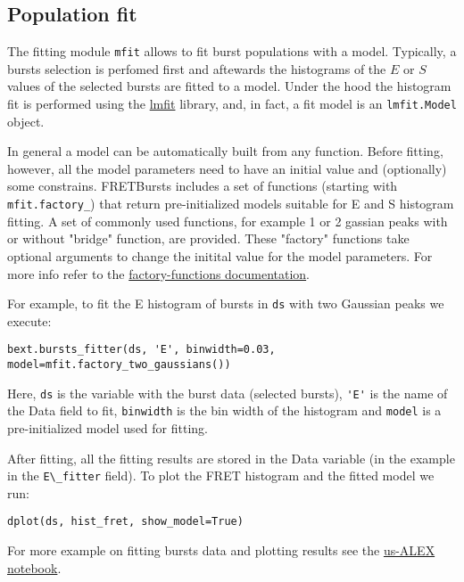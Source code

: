 
\subsection{Population fit}

The fitting module \verb|mfit| allows to fit burst populations with a model. Typically, a bursts selection is perfomed first and aftewards the histograms of the $E$ or $S$ values of the selected bursts are fitted to a model. Under the hood the histogram fit is performed using the \href{http://lmfit.github.io/lmfit-py/}{lmfit} library, and, in fact, 
a fit model is an \verb|lmfit.Model| object.

In general a model can be automatically built from any function. Before fitting, however, all the model parameters need to have an initial value and (optionally) some constrains. FRETBursts includes a set of functions (starting with \verb|mfit.factory_|) that return pre-initialized models suitable for E and S histogram fitting. A set of commonly used functions, for example 1 or 2 gassian peaks with or without "bridge" function, are provided. These "factory" functions take optional arguments to change the initital value for the model parameters. For more info refer to the
\href{http://fretbursts.readthedocs.org/en/latest/mfit.html#model-factory-functions}{factory-functions documentation}.

For example, to fit the E histogram of bursts in \verb|ds| with two Gaussian peaks we execute:

\begin{verbatim}
bext.bursts_fitter(ds, 'E', binwidth=0.03, model=mfit.factory_two_gaussians())
\end{verbatim}

Here, \verb|ds| is the variable with the burst data (selected bursts), \verb|'E'| is the name of the Data field to fit, \verb|binwidth| is the bin width of the histogram and \verb|model| is a pre-initialized model used for fitting.

After fitting, all the fitting results are stored in the Data variable (in the example in the \verb|E\_fitter| field).
To plot the FRET histogram and the fitted model we run:

\begin{verbatim}
dplot(ds, hist_fret, show_model=True)
\end{verbatim}

For more example on fitting bursts data and plotting results see the \href{http://nbviewer.ipython.org/urls/raw.github.com/tritemio/FRETBursts_notebooks/master/notebooks/FRETBursts\%2520-\%2520us-ALEX\%2520smFRET\%2520burst\%2520analysis.ipynb}{us-ALEX notebook}.

